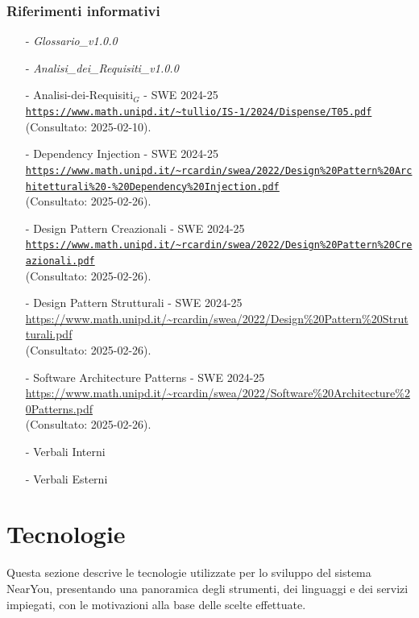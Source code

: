 \documentclass[10pt]{article}
\begin{document}
\subsubsection{Riferimenti informativi}
\begin{itemize}
    \item[-] \textit{Glossario\_v1.0.0}
    \item[-] \textit{Analisi\_dei\_Requisiti\_v1.0.0}
    \item[-] Analisi-dei-Requisiti$_G$ - SWE 2024-25\\
    \textcolor{blue}{\texttt{\url{https://www.math.unipd.it/\~tullio/IS-1/2024/Dispense/T05.pdf}}}\\ (Consultato: 2025-02-10).

    \item[-] Dependency Injection - SWE 2024-25\\
    \textcolor{blue}{\texttt{\url{https://www.math.unipd.it/\~rcardin/swea/2022/Design\%20Pattern\%20Architetturali\%20-\%20Dependency\%20Injection.pdf}}}\\ (Consultato: 2025-02-26).

    \item[-] Design Pattern Creazionali - SWE 2024-25\\
    \textcolor{blue}{\texttt{\url{https://www.math.unipd.it/\~rcardin/swea/2022/Design\%20Pattern\%20Creazionali.pdf}}}\\ (Consultato: 2025-02-26).

    \item[-] Design Pattern Strutturali - SWE 2024-25\\
    \textcolor{blue}{\url{https://www.math.unipd.it/\~rcardin/swea/2022/Design\%20Pattern\%20Strutturali.pdf}}\\ (Consultato: 2025-02-26).

    \item[-] Software Architecture Patterns - SWE 2024-25\\
    \textcolor{blue}{\url{https://www.math.unipd.it/\~rcardin/swea/2022/Software\%20Architecture\%20Patterns.pdf}}\\ (Consultato: 2025-02-26).

    \item[-] Verbali Interni
    \item[-] Verbali Esterni
\end{itemize}


\section{Tecnologie}
Questa sezione descrive le tecnologie utilizzate per lo sviluppo del sistema NearYou, presentando una panoramica degli strumenti, dei linguaggi e dei servizi impiegati, con le motivazioni alla base delle scelte effettuate.
\end{document}
